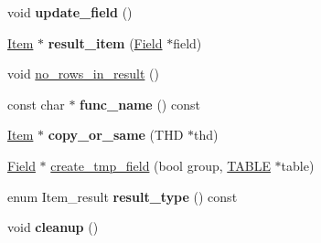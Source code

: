 \begin{DoxyCompactItemize}
void {\bfseries update\+\_\+field} ()
\item 
\mbox{\label{classItem__sum__variance_ad2a9a7cc075683f4546d5ea80c965c78}} 
\mbox{\hyperlink{classItem}{Item}} $\ast$ {\bfseries result\+\_\+item} (\mbox{\hyperlink{classField}{Field}} $\ast$field)
\item 
void \mbox{\hyperlink{classItem__sum__variance_a510a0268827bac0bf1fc4cf933813745}{no\+\_\+rows\+\_\+in\+\_\+result}} ()
\item 
\mbox{\label{classItem__sum__variance_a3dd7f9e37a2c389e39530375d98723b0}} 
const char $\ast$ {\bfseries func\+\_\+name} () const
\item 
\mbox{\label{classItem__sum__variance_a60ecbccc1978936123cb2ea88c855250}} 
\mbox{\hyperlink{classItem}{Item}} $\ast$ {\bfseries copy\+\_\+or\+\_\+same} (T\+HD $\ast$thd)
\item 
\mbox{\hyperlink{classField}{Field}} $\ast$ \mbox{\hyperlink{classItem__sum__variance_a3e42297be638c4a648262165708e5440}{create\+\_\+tmp\+\_\+field}} (bool group, \mbox{\hyperlink{structTABLE}{T\+A\+B\+LE}} $\ast$table)
\item 
\mbox{\label{classItem__sum__variance_a612c484fd9175c5d130b9957cdacc9c5}} 
enum Item\+\_\+result {\bfseries result\+\_\+type} () const
\item 
\mbox{\label{classItem__sum__variance_a9c0d8465385d75f01ad5a4647cea310e}} 
void {\bfseries cleanup} ()
\end{DoxyCompactItemize}
